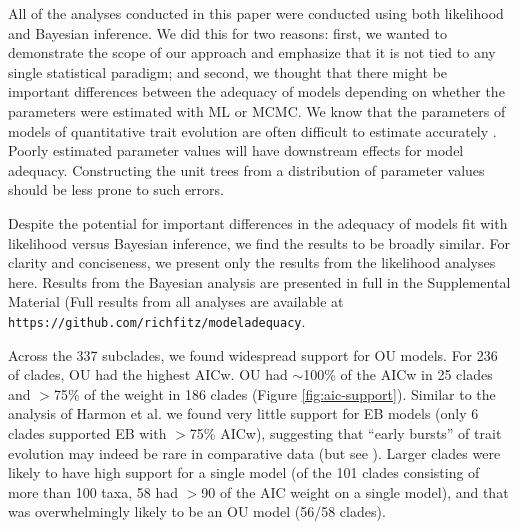 \documentclass[a4paper,12pt]{article}
\begin{document}
All of the analyses conducted in this paper were conducted using both likelihood and Bayesian inference. We did this for two reasons: first, we wanted to demonstrate the scope of our approach and emphasize that it is not tied to any single statistical paradigm; and second, we thought that there might be important differences between the adequacy of models depending on whether the parameters were estimated with ML or MCMC. We know that the parameters of models of quantitative trait evolution are often difficult to estimate accurately \citep{Ane2008, HoAne2012}. 
Poorly estimated parameter values will have downstream effects for model adequacy. Constructing the unit trees from a distribution of parameter values should be less prone to such errors. 

Despite the potential for important differences in the adequacy of models fit with likelihood versus Bayesian inference, we find the results to be broadly similar. For clarity and conciseness, we present only the results from the likelihood analyses here. Results from the Bayesian analysis are presented in full in the Supplemental Material (Full results from all analyses are available at \texttt{https://github.com/richfitz/modeladequacy}. 

Across the 337 subclades, we found widespread support for OU
models. For 236 of clades, OU had the highest AICw.
OU had $\sim$100\% of the AICw in 25 clades and $>$75\% of the weight in 186 clades (Figure \ref{fig:aic-support}). Similar to the analysis of Harmon et al. \citep{Harmon2010} we found very little support for EB models (only 6 clades supported EB with $>$75\% AICw), suggesting that ``early bursts'' of trait evolution may indeed be rare in comparative data (but see \citep{SlaterPennell}). Larger clades were
likely to have high support for a single model (of the 101 clades consisting of more than 100 taxa, 58 had $>$90 of the AIC weight on a single model),
and that was overwhelmingly likely to be an OU model (56/58 clades). 
\end{document}
